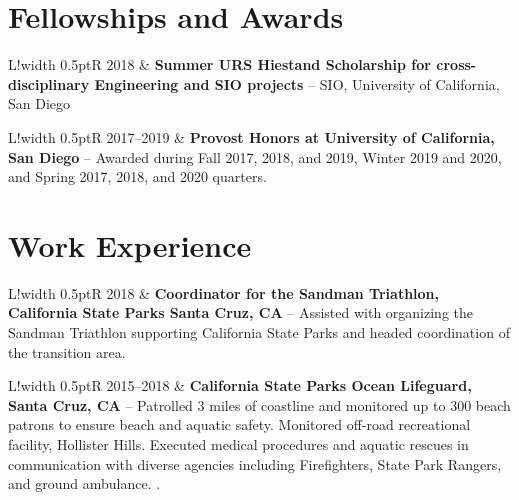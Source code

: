 \documentclass[10pt]{article}
\newcommand\VRule{\color{lightgray}\vrule width 0.5pt}
\begin{document}
\vspace{.3cm}
\section*{Fellowships and Awards}
\vspace{.3cm}
\begin{tabular}{L!{\VRule}R}
2018 & \textbf{Summer URS Hiestand Scholarship for cross-disciplinary Engineering and SIO projects} -- SIO, University of California, San Diego\\[5pt]
\end{tabular}
\newline \noindent
\newline \noindent 
\newline \noindent
\begin{tabular}{L!{\VRule}R}
2017--2019 & \textbf{Provost Honors at University of California, San Diego} -- Awarded during Fall 2017, 2018, and 2019, Winter 2019 and 2020, and Spring 2017, 2018, and 2020 quarters.\\[5pt]
\end{tabular}


\vspace{.3cm}
\section*{Work Experience}
\vspace{.3cm}
\begin{tabular}{L!{\VRule}R}
2018 & \textbf{Coordinator for the Sandman Triathlon, California State Parks Santa Cruz, CA} -- Assisted with organizing the Sandman Triathlon supporting California State Parks and headed coordination of the transition area.\\[5pt]
\end{tabular}
\newline \noindent
\newline \noindent 
\newline \noindent
\begin{tabular}{L!{\VRule}R}
2015--2018 & \textbf{California State Parks Ocean Lifeguard, Santa Cruz, CA} -- Patrolled 3 miles of coastline and monitored up to 300 beach patrons to ensure beach and aquatic safety. Monitored off-road recreational facility, Hollister Hills. Executed medical procedures and aquatic rescues in communication with diverse agencies including Firefighters, State Park Rangers, and ground ambulance.
.\\[5pt] 
\end{tabular}
\end{document}
